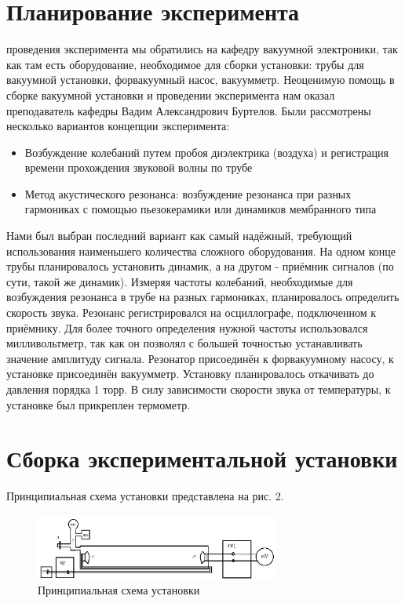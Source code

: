 \documentclass[a4paper,12pt]{article}
\begin{document}
\section{Планирование эксперимента}

 проведения эксперимента мы обратились на кафедру вакуумной электроники, так как там есть оборудование, необходимое для сборки установки: трубы для вакуумной установки, форвакуумный насос, вакуумметр. Неоценимую помощь в сборке вакуумной установки и проведении эксперимента нам оказал преподаватель кафедры Вадим Александрович Буртелов. Были рассмотрены несколько вариантов концепции эксперимента:
\begin{itemize}
    \item Возбуждение колебаний путем пробоя диэлектрика (воздуха) и регистрация времени прохождения звуковой волны по трубе
    \item Метод акустического резонанса: возбуждение резонанса при разных гармониках с помощью пьезокерамики или динамиков мембранного типа
\end{itemize}

Нами был выбран последний вариант как самый надёжный, требующий использования наименьшего количества сложного оборудования. На одном конце трубы планировалось установить динамик, а на другом - приёмник сигналов (по сути, такой же динамик). Измеряя частоты колебаний, необходимые для возбуждения резонанса в трубе на разных гармониках, планировалось определить скорость звука. Резонанс регистрировался на осциллографе, подключенном к приёмнику. Для более точного определения нужной частоты использовался милливольтметр, так как он позволял с большей точностью устанавливать значение амплитуду сигнала. Резонатор присоединён к форвакуумному насосу, к установке присоединён вакуумметр. Установку планировалось откачивать до давления порядка 1 торр. В силу зависимости скорости звука от температуры, к установке был прикреплен термометр.

\section{Сборка экспериментальной установки}

Принципиальная схема установки представлена на рис. 2. \par

\begin{figure}[h]
    \centering
    \includegraphics[width=80mm]{setup.png}
    \caption{Принципиальная схема установки}
    \label{setup}
\end{figure}
\end{document}
